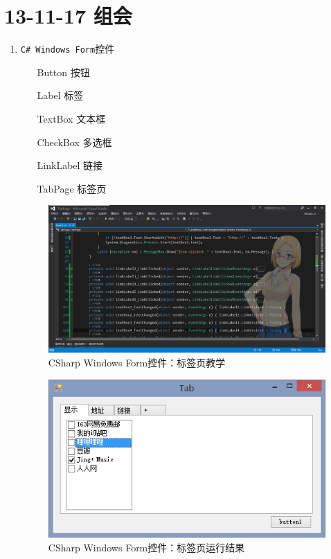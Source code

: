 \documentclass[]{report}
\begin{document}
\section{13-11-17 组会}
\begin{enumerate}
	\item \verb|C# Windows Form|控件
	\begin{itemize}
		\item[Button] 按钮
		\item[Label] 标签
		\item[TextBox] 文本框
		\item[CheckBox] 多选框
		\item[LinkLabel] 链接
		\item[TabPage] 标签页
	\end{itemize}
\begin{figure}
\centering
\includegraphics[width=1\linewidth]{./PIC/TabPage}
\caption{CSharp Windows Form控件：标签页教学}
\label{fig:TabPage}
\end{figure}
\begin{figure}
\centering
\includegraphics[width=0.7\linewidth]{./PIC/TabPageO}
\caption{CSharp Windows Form控件：标签页运行结果}
\label{fig:TabPageO}
\end{figure}
\end{enumerate}
\end{document}
